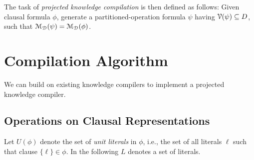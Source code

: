 \documentclass[letterpaper,USenglish,cleveref, autoref, thm-restate]{lipics-v2021}
\newcommand{\lit}{\ell}
\newcommand{\dvarset}{D}
\newcommand{\dependencyset}{{\cal V}}
\newcommand{\dmodelset}{{\cal M_{D}}}
\begin{document}
The task of \emph{projected knowledge compilation} is then defined as follows: Given clausal formula $\phi$, generate a partitioned-operation formula $\psi$ having $\dependencyset(\psi) \subseteq \dvarset$, such that
$\dmodelset(\psi) = \dmodelset(\phi)$.

\section{Compilation Algorithm}

We can build on existing knowledge compilers to implement a projected knowledge compiler.

\subsection{Operations on Clausal Representations}

Let $U(\phi)$ denote the set of \emph{unit literals} in $\phi$, i.e., the set of all literals $\lit$ such that clause $\{ \lit \} \in \phi$.  In the following $L$ denotes a set of literals.
\end{document}
